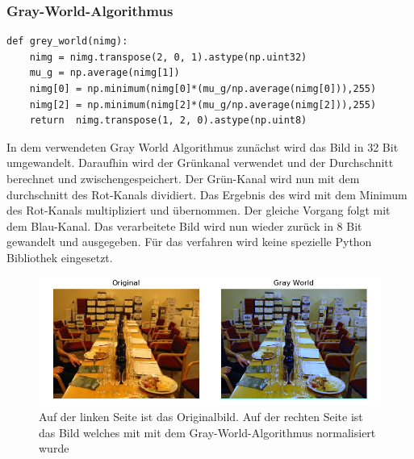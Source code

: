 \documentclass[a4paper,12pt,oneside]{article}
\begin{document}
\subsubsection{Gray-World-Algorithmus}
\begin{lstlisting}
def grey_world(nimg):
    nimg = nimg.transpose(2, 0, 1).astype(np.uint32)
    mu_g = np.average(nimg[1])
    nimg[0] = np.minimum(nimg[0]*(mu_g/np.average(nimg[0])),255)
    nimg[2] = np.minimum(nimg[2]*(mu_g/np.average(nimg[2])),255)
    return  nimg.transpose(1, 2, 0).astype(np.uint8)
\end{lstlisting}
In dem verwendeten Gray World Algorithmus \cite{gray2012world} zunächst wird das Bild in 32 Bit umgewandelt. Daraufhin wird der Grünkanal verwendet und der Durchschnitt berechnet und zwischengespeichert. Der Grün-Kanal wird nun mit dem durchschnitt des Rot-Kanals dividiert. Das Ergebnis des wird mit dem Minimum des Rot-Kanals multipliziert und übernommen. Der gleiche Vorgang folgt mit dem Blau-Kanal. Das verarbeitete Bild wird nun wieder zurück in 8 Bit gewandelt und ausgegeben. Für das verfahren wird keine spezielle Python Bibliothek eingesetzt.
\begin{figure}
	[h]
	\centering
	\includegraphics[scale=0.7]{Sources/gwn.png}
	\caption{Auf der linken Seite ist das Originalbild. Auf der rechten Seite ist das Bild welches mit mit dem Gray-World-Algorithmus normalisiert wurde}
	\label{img:gwnimg}
\end{figure}
\end{document}

